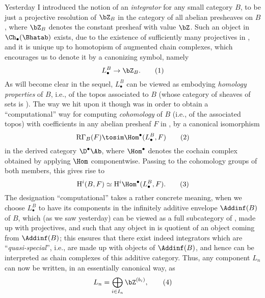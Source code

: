\noindent\hfill{}\par

\label{sec:100}%
Yesterday I introduced the notion of an \emph{integrator} for any
small category $B$, to be just a projective resolution of $\bZ_B$ in
the category \Bhatab{} of all abelian presheaves on $B$, where $\bZ_B$
denotes the constant presheaf with value $\bZ$. Such an object in
$\Ch_\bullet(\Bhatab)$ exists, due to the existence of sufficiently
many projectives in \Bhatab, and it is unique up to homotopism of
augmented chain complexes, which encourages us to denote it by a
canonizing symbol, namely
\begin{equation}
  \label{eq:100.1}
  L_\bullet^B\to \bZ_B.\tag{1}
\end{equation}
As will become clear in the sequel, $L_\bullet^B$ can be viewed as
embodying \emph{homology properties} of $B$, i.e., of the topos
associated to $B$ (whose category of sheaves of sets is \Bhat). The
way we hit upon it though was in order to obtain a ``computational''
way for computing \emph{cohomology} of $B$ (i.e., of the associated
topos) with coefficients in any abelian presheaf $F$ in \Bhatab, by a
canonical isomorphism
\begin{equation}
  \label{eq:100.2}
  \mathrm R \Gamma_B(F) \tosim \Hom^\bullet(L_\bullet^B,F)\tag{2}
\end{equation}
in the derived category $\D^\bullet\Ab$, where $\Hom^\bullet$ denotes
the cochain complex obtained by applying $\Hom$ componentwise. Passing
to the cohomology groups of both members, this gives rise to
\begin{equation}
  \label{eq:100.3}
  \mathrm H^i(B,F) \simeq \mathrm H^i \Hom^\bullet(L_\bullet^B,F).\tag{3}
\end{equation}
The designation ``computational'' takes a rather concrete meaning,
when we choose $L_\bullet^B$ to have its components in the infinitely
additive envelope $\Addinf(B)$ of $B$, which (as we saw yesterday) can
be viewed as a full subcategory of \Bhatab, made up with projectives,
and such that any object in \Bhat{} is quotient of an object coming
from $\Addinf(B)$; this ensures that there exist indeed integrators
which are ``\emph{quasi-special}'', i.e., are made up with objects of
$\Addinf(B)$, and hence can be interpreted as chain complexes of this
additive category. Thus, any component $L_n$ can now be written, in an
essentially canonical way, as
\begin{equation}
  \label{eq:100.4}
  L_n = \bigoplus_{i\in I_n} \bZ^{(b_i)} ,\tag{4}
\end{equation}
